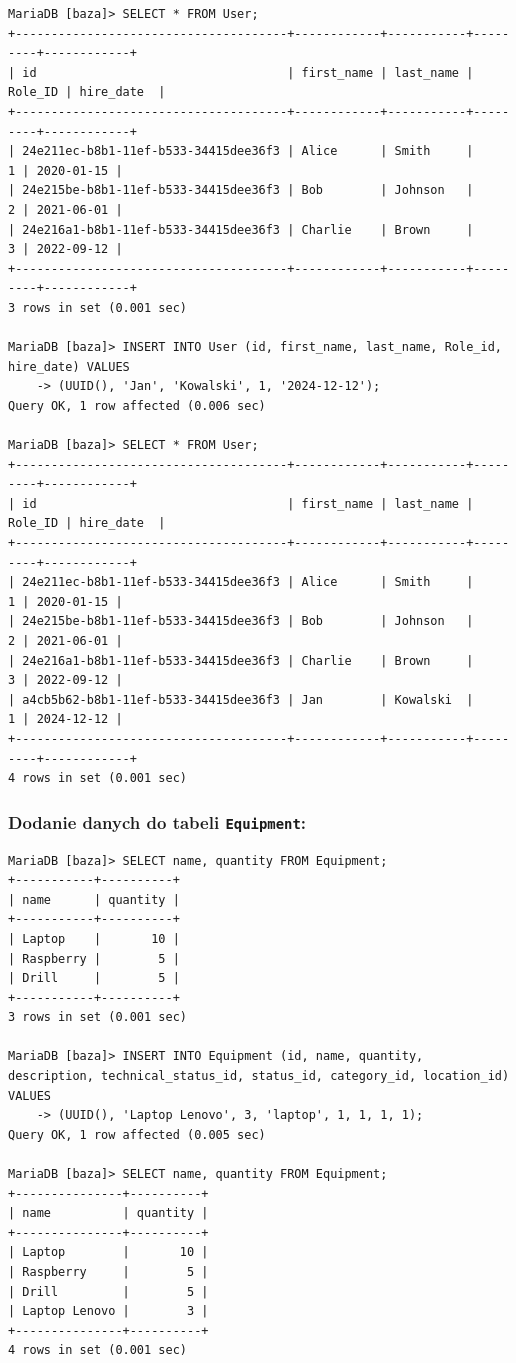 \documentclass{article}
\begin{document}
\begin{verbatim}
MariaDB [baza]> SELECT * FROM User;
+--------------------------------------+------------+-----------+---------+------------+
| id                                   | first_name | last_name | Role_ID | hire_date  |
+--------------------------------------+------------+-----------+---------+------------+
| 24e211ec-b8b1-11ef-b533-34415dee36f3 | Alice      | Smith     |       1 | 2020-01-15 |
| 24e215be-b8b1-11ef-b533-34415dee36f3 | Bob        | Johnson   |       2 | 2021-06-01 |
| 24e216a1-b8b1-11ef-b533-34415dee36f3 | Charlie    | Brown     |       3 | 2022-09-12 |
+--------------------------------------+------------+-----------+---------+------------+
3 rows in set (0.001 sec)

MariaDB [baza]> INSERT INTO User (id, first_name, last_name, Role_id, hire_date) VALUES
    -> (UUID(), 'Jan', 'Kowalski', 1, '2024-12-12');
Query OK, 1 row affected (0.006 sec)

MariaDB [baza]> SELECT * FROM User;
+--------------------------------------+------------+-----------+---------+------------+
| id                                   | first_name | last_name | Role_ID | hire_date  |
+--------------------------------------+------------+-----------+---------+------------+
| 24e211ec-b8b1-11ef-b533-34415dee36f3 | Alice      | Smith     |       1 | 2020-01-15 |
| 24e215be-b8b1-11ef-b533-34415dee36f3 | Bob        | Johnson   |       2 | 2021-06-01 |
| 24e216a1-b8b1-11ef-b533-34415dee36f3 | Charlie    | Brown     |       3 | 2022-09-12 |
| a4cb5b62-b8b1-11ef-b533-34415dee36f3 | Jan        | Kowalski  |       1 | 2024-12-12 |
+--------------------------------------+------------+-----------+---------+------------+
4 rows in set (0.001 sec)
\end{verbatim}

\subsubsection*{Dodanie danych do tabeli \texttt{Equipment}:}

\begin{verbatim}
MariaDB [baza]> SELECT name, quantity FROM Equipment;
+-----------+----------+
| name      | quantity |
+-----------+----------+
| Laptop    |       10 |
| Raspberry |        5 |
| Drill     |        5 |
+-----------+----------+
3 rows in set (0.001 sec)

MariaDB [baza]> INSERT INTO Equipment (id, name, quantity, description, technical_status_id, status_id, category_id, location_id) VALUES
    -> (UUID(), 'Laptop Lenovo', 3, 'laptop', 1, 1, 1, 1);
Query OK, 1 row affected (0.005 sec)

MariaDB [baza]> SELECT name, quantity FROM Equipment;
+---------------+----------+
| name          | quantity |
+---------------+----------+
| Laptop        |       10 |
| Raspberry     |        5 |
| Drill         |        5 |
| Laptop Lenovo |        3 |
+---------------+----------+
4 rows in set (0.001 sec)
\end{verbatim}
\end{document}
